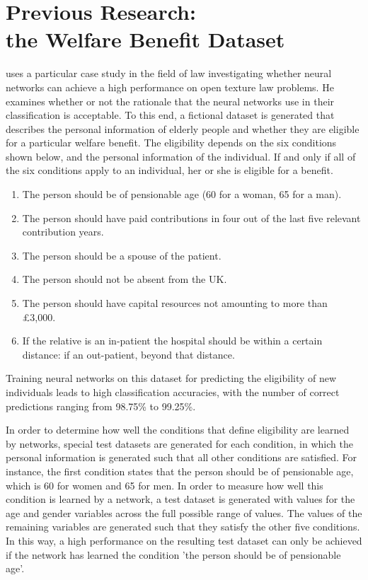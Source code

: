 \documentclass[letterpaper]{article} %
\begin{document}
\section{Previous Research:  \\the Welfare Benefit Dataset}
\cite{bench1993neural} uses a particular case study in the field of law investigating whether neural networks can achieve a high performance on open texture law problems. He examines whether or not the rationale that the neural networks use in their classification is acceptable. To this end, a fictional dataset is generated that describes the personal information of elderly people and whether they are eligible for a particular welfare benefit. The eligibility depends on the six conditions shown below, and the personal information of the individual. If and only if all of the six conditions apply to an individual, her or she is eligible for a benefit. 

\begin{enumerate}
\item
The person should be of pensionable age (60 for a woman, 65 for a man).
\item
The person should have paid contributions in four out of the last five relevant contribution years. 
\item
The person should be a spouse of the patient.
\item
The person should not be absent from the UK.
\item
The person should have capital resources not amounting to more than \pounds 3,000.
\item 
If the relative is an in-patient the hospital should be within a certain distance: if an out-patient, beyond that distance.
\end{enumerate}

\noindent Training neural networks on this dataset for predicting the eligibility of new individuals leads to high classification accuracies, with the number of correct predictions ranging from 98.75\% to 99.25\%. 

In order to determine how well the conditions that define eligibility are learned by networks, special test datasets are generated for each condition, in which the personal information is generated such that all other conditions are satisfied. For instance, the first condition states that the person should be of pensionable age, which is 60 for women and 65 for men. In order to measure how well this condition is learned by a network, a test dataset is generated with values for the age and gender variables across the full possible range of values. The values of the remaining variables are generated such that they satisfy the other five conditions. In this way, a high performance on the resulting test dataset can only be achieved if the network has learned the condition 'the person should be of pensionable age'.
\end{document}
